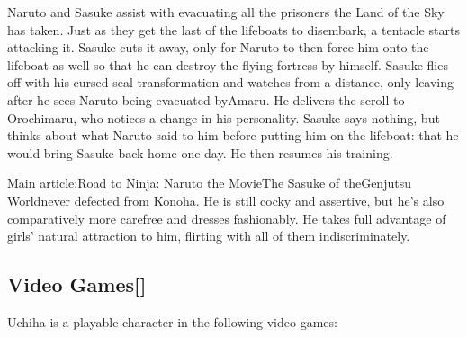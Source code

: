 \documentclass[a4paper,12pt]{article}
\begin{document}
Naruto and Sasuke assist with evacuating all the prisoners the Land of the Sky has taken. Just as they get the last of the lifeboats to disembark, a tentacle starts attacking it. Sasuke cuts it away, only for Naruto to then force him onto the lifeboat as well so that he can destroy the flying fortress by himself. Sasuke flies off with his cursed seal transformation and watches from a distance, only leaving after he sees Naruto being evacuated byAmaru. He delivers the scroll to Orochimaru, who notices a change in his personality. Sasuke says nothing, but thinks about what Naruto said to him before putting him on the lifeboat: that he would bring Sasuke back home one day. He then resumes his training.\\ \par \vspace{0.5cm}

Main article:Road to Ninja: Naruto the MovieThe Sasuke of theGenjutsu Worldnever defected from Konoha. He is still cocky and assertive, but he's also comparatively more carefree and dresses fashionably. He takes full advantage of girls' natural attraction to him, flirting with all of them indiscriminately.\\ \par \vspace{0.5cm}

\subsection*{Video Games[]}\n\nSasuke Uchiha is a playable character in the following video games:\\ \par \vspace{0.5cm}
\end{document}
